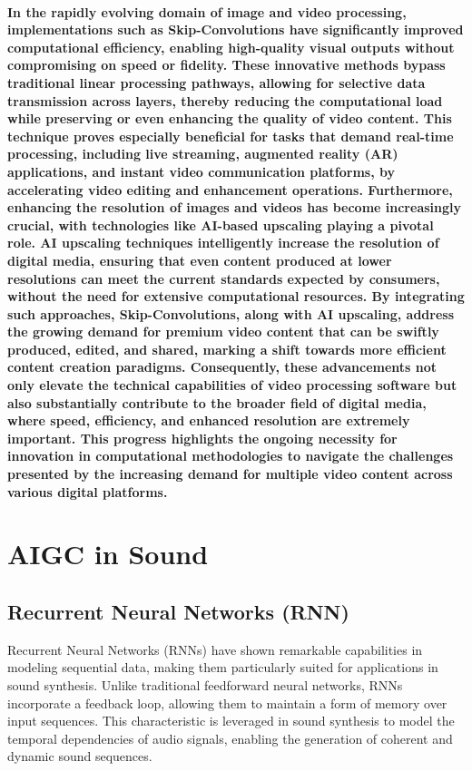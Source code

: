 \documentclass[11pt,a4paper,oneside]{report}
\begin{document}
\paragraph{In the rapidly evolving domain of image and video processing, implementations such as Skip-Convolutions \cite{habibian2021skip} have significantly improved computational efficiency, enabling high-quality visual outputs without compromising on speed or fidelity. 
These innovative methods bypass traditional linear processing pathways, allowing for selective data transmission across layers, thereby reducing the computational load while preserving or even enhancing the quality of video content. 
This technique proves especially beneficial for tasks that demand real-time processing, including live streaming, augmented reality (AR) applications, and instant video communication platforms, by accelerating video editing and enhancement operations. 
Furthermore, enhancing the resolution of images and videos has become increasingly crucial, with technologies like AI-based upscaling playing a pivotal role. 
AI upscaling techniques intelligently increase the resolution of digital media, ensuring that even content produced at lower resolutions can meet the current standards expected by consumers, without the need for extensive computational resources. \cite{ignatov2021real}
By integrating such approaches, Skip-Convolutions, along with AI upscaling, address the growing demand for premium video content that can be swiftly produced, edited, and shared, marking a shift towards more efficient content creation paradigms. 
Consequently, these advancements not only elevate the technical capabilities of video processing software but also substantially contribute to the broader field of digital media, where speed, efficiency, and enhanced resolution are extremely important. 
This progress highlights the ongoing necessity for innovation in computational methodologies to navigate the challenges presented by the increasing demand for multiple video content across various digital platforms.}


\section{AIGC in Sound}

\subsection{Recurrent Neural Networks (RNN)}

Recurrent Neural Networks (RNNs) \cite{srivastava2015unsupervised, chiappa2017recurrent, ha2018world} have shown remarkable capabilities in modeling sequential data, making them particularly suited for applications in sound synthesis. 
Unlike traditional feedforward neural networks, RNNs incorporate a feedback loop, allowing them to maintain a form of memory over input sequences. 
This characteristic is leveraged in sound synthesis to model the temporal dependencies of audio signals, enabling the generation of coherent and dynamic sound sequences.
\end{document}
